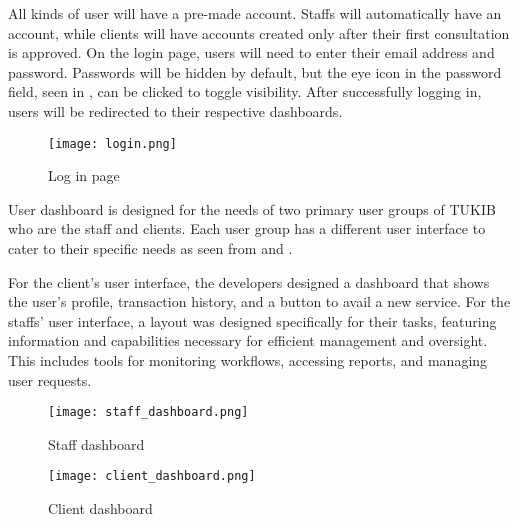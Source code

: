 \noindent All kinds of user will have a pre-made account. Staffs will automatically have an account, while clients will have accounts created only after their first consultation is approved. On the login page, users will need to enter their email address and password. Passwords will be hidden by default, but the eye icon in the password field, seen in , can be clicked to toggle visibility. After successfully logging in, users will be redirected to their respective dashboards.

\begin{figure}[h]
	\centering 
	\texttt{[image: login.png]}
	\caption{Log in page}
	\label{fig:login}
\end{figure}

User dashboard is designed for the needs of two primary user groups of TUKIB who are the staff and clients. Each user group has a different user interface to cater to their specific needs as seen from  and . 

For the client’s user interface, the developers designed a dashboard that shows the user’s profile, transaction history, and a button to avail a new service. For the staffs’ user interface, a layout was designed specifically for their tasks, featuring information and capabilities necessary for efficient management and oversight. This includes tools for monitoring workflows, accessing reports, and managing user requests.

\begin{figure}[h]
	\centering 
	\texttt{[image: staff\_dashboard.png]}
	\caption{Staff dashboard}
	\label{fig:staff_dashboard}
\end{figure}

\begin{figure}[h]
	\centering 
	\texttt{[image: client\_dashboard.png]}
	\caption{Client dashboard}
	\label{fig:client_dashboard}
\end{figure}

